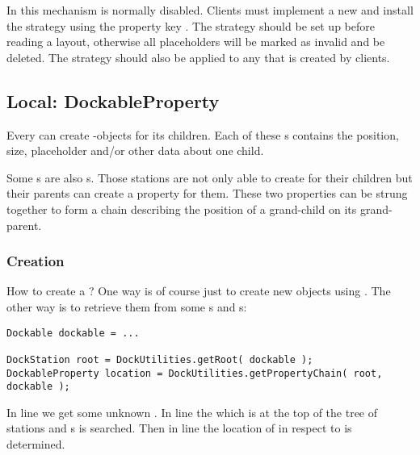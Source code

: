 In  this mechanism is normally disabled. Clients must implement a new  and install the strategy using the property key . The strategy should be set up before reading a layout, otherwise all placeholders will be marked as invalid and be deleted. The strategy should also be applied to any  that is created by clients.




\subsection{Local: DockableProperty}
Every  can create -objects for its children. Each of these s contains the position, size, placeholder and/or other data about one child. 

Some s are also s. Those stations are not only able to create  for their children but their parents can create a property for them. These two properties can be strung together to form a chain describing the position of a grand-child on its grand-parent.

\subsubsection{Creation}
How to create a ? One way is of course just to create new objects using . The other way is to retrieve them from some s and s:
\begin{lstlisting}
Dockable dockable = ...

DockStation root = DockUtilities.getRoot( dockable );
DockableProperty location = DockUtilities.getPropertyChain( root, dockable );
\end{lstlisting}
In line  we get some unknown . In line  the  which is at the top of the tree of stations and s is searched. Then in line  the location of  in respect to  is determined.

